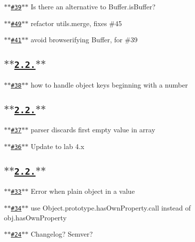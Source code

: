 \begin{DoxyItemize}
\item \href{https://github.com/hapijs/qs/issues/39}{\tt $\ast$$\ast$\#39$\ast$$\ast$} Is there an alternative to Buffer.\+is\+Buffer?
\item \href{https://github.com/hapijs/qs/issues/49}{\tt $\ast$$\ast$\#49$\ast$$\ast$} refactor utils.\+merge, fixes \#45
\item \href{https://github.com/hapijs/qs/issues/41}{\tt $\ast$$\ast$\#41$\ast$$\ast$} avoid browserifying Buffer, for \#39
\end{DoxyItemize}

\subsection*{\href{https://github.com/hapijs/qs/issues?milestone=13&state=closed}{\tt $\ast$$\ast$2.2.$\ast$$\ast$}}


\begin{DoxyItemize}
\item \href{https://github.com/hapijs/qs/issues/38}{\tt $\ast$$\ast$\#38$\ast$$\ast$} how to handle object keys beginning with a number
\end{DoxyItemize}

\subsection*{\href{https://github.com/hapijs/qs/issues?milestone=12&state=closed}{\tt $\ast$$\ast$2.2.$\ast$$\ast$}}


\begin{DoxyItemize}
\item \href{https://github.com/hapijs/qs/issues/37}{\tt $\ast$$\ast$\#37$\ast$$\ast$} parser discards first empty value in array
\item \href{https://github.com/hapijs/qs/issues/36}{\tt $\ast$$\ast$\#36$\ast$$\ast$} Update to lab 4.\+x
\end{DoxyItemize}

\subsection*{\href{https://github.com/hapijs/qs/issues?milestone=11&state=closed}{\tt $\ast$$\ast$2.2.$\ast$$\ast$}}


\begin{DoxyItemize}
\item \href{https://github.com/hapijs/qs/issues/33}{\tt $\ast$$\ast$\#33$\ast$$\ast$} Error when plain object in a value
\item \href{https://github.com/hapijs/qs/issues/34}{\tt $\ast$$\ast$\#34$\ast$$\ast$} use Object.\+prototype.\+has\+Own\+Property.\+call instead of obj.\+has\+Own\+Property
\item \href{https://github.com/hapijs/qs/issues/24}{\tt $\ast$$\ast$\#24$\ast$$\ast$} Changelog? Semver?
\end{DoxyItemize}

